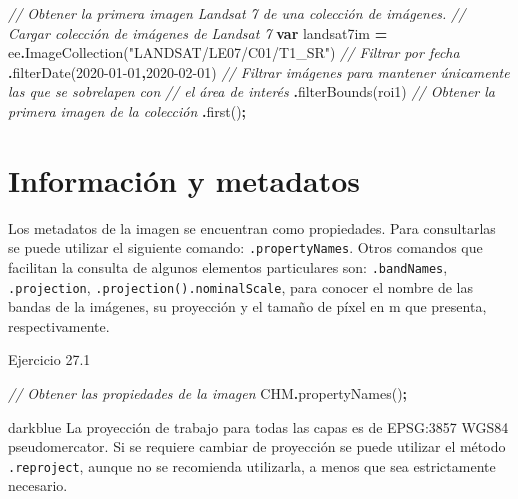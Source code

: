 \documentclass[
  12pt,
  letterpaper,
  twoside]{book}
\newenvironment{Shaded}{\begin{snugshade}}{\end{snugshade}}
\newcommand{\CommentTok}[1]{\textcolor[rgb]{0.56,0.35,0.01}{\textit{#1}}}
\newcommand{\FunctionTok}[1]{\textcolor[rgb]{0.00,0.00,0.00}{#1}}
\newcommand{\KeywordTok}[1]{\textcolor[rgb]{0.13,0.29,0.53}{\textbf{#1}}}
\newcommand{\NormalTok}[1]{#1}
\newcommand{\OperatorTok}[1]{\textcolor[rgb]{0.81,0.36,0.00}{\textbf{#1}}}
\newcommand{\StringTok}[1]{\textcolor[rgb]{0.31,0.60,0.02}{#1}}
\begin{document}
\begin{Shaded}
\begin{Highlighting}[]
\CommentTok{// Obtener la primera imagen Landsat 7 de una colección de imágenes.}
\CommentTok{// Cargar colección de imágenes de Landsat 7          }
\KeywordTok{var}\NormalTok{ landsat7im }\OperatorTok{=}\NormalTok{ ee}\OperatorTok{.}\FunctionTok{ImageCollection}\NormalTok{(}\StringTok{"LANDSAT/LE07/C01/T1\_SR"}\NormalTok{)}
  \CommentTok{// Filtrar por fecha}
  \OperatorTok{.}\FunctionTok{filterDate}\NormalTok{(}\StringTok{\textquotesingle{}2020{-}01{-}01\textquotesingle{}}\OperatorTok{,}\StringTok{\textquotesingle{}2020{-}02{-}01\textquotesingle{}}\NormalTok{)}
  \CommentTok{// Filtrar imágenes para mantener únicamente las que se sobrelapen con }
  \CommentTok{// el área de interés}
  \OperatorTok{.}\FunctionTok{filterBounds}\NormalTok{(roi1)}
  \CommentTok{// Obtener la primera imagen de la colección}
  \OperatorTok{.}\FunctionTok{first}\NormalTok{()}\OperatorTok{;}
\end{Highlighting}
\end{Shaded}

\hypertarget{informaciuxf3n-y-metadatos-3}{%
\section{Información y metadatos}\label{informaciuxf3n-y-metadatos-3}}

Los metadatos de la imagen se encuentran como propiedades. Para consultarlas se puede utilizar el siguiente comando: \texttt{.propertyNames}. Otros comandos que facilitan la consulta de algunos elementos particulares son: \texttt{.bandNames}, \texttt{.projection}, \texttt{.projection().nominalScale}, para conocer el nombre de las bandas de la imágenes, su proyección y el tamaño de píxel en m que presenta, respectivamente.

Ejercicio 27.1

\begin{Shaded}
\begin{Highlighting}[]
\CommentTok{// Obtener las propiedades de la imagen}
\NormalTok{CHM}\OperatorTok{.}\FunctionTok{propertyNames}\NormalTok{()}\OperatorTok{;}
\end{Highlighting}
\end{Shaded}

\begin{bluebox2}

\begin{awesomeblock}{5pt}{\faLightbulb}{darkblue}
La proyección de trabajo para todas las capas es de EPSG:3857 WGS84 pseudomercator. Si se requiere cambiar de proyección se puede utilizar el método \texttt{.reproject}, aunque no se recomienda utilizarla, a menos que sea estrictamente necesario.

\end{awesomeblock}

\end{bluebox2}
\end{document}
